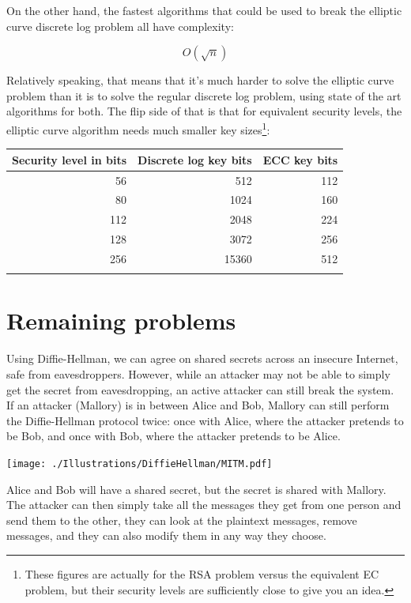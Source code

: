 \documentclass[11pt,ebook,table,dvipsnames]{memoir}
\begin{document}
On the other hand, the fastest algorithms that could be used to break
the elliptic curve discrete log problem all have complexity:

\[
O(\sqrt{n})
\]

Relatively speaking, that means that it's much harder to solve the
elliptic curve problem than it is to solve the regular discrete log
problem, using state of the art algorithms for both. The flip side of
that is that for equivalent security levels, the elliptic curve
algorithm needs much smaller key
sizes\cite{rsa:keysizes}\cite{nist:keymanagement}\footnote{These figures are
actually for the RSA problem versus the equivalent EC problem, but
their security levels are sufficiently close to give you an idea.}:

\begin{center}
\begin{tabular}{rrr}
Security level in bits & Discrete log key bits & ECC key bits\\
\hline
56 & 512 & 112\\
80 & 1024 & 160\\
112 & 2048 & 224\\
128 & 3072 & 256\\
256 & 15360 & 512\\
 &  & \\
\end{tabular}
\end{center}
\section{Remaining problems}
\label{sec-2-4-5}

Using Diffie-Hellman, we can agree on shared secrets across an
insecure Internet, safe from eavesdroppers. However, while an attacker
may not be able to simply get the secret from eavesdropping, an active
attacker can still break the system. If an attacker (Mallory) is in
between Alice and Bob, Mallory can still perform the Diffie-Hellman
protocol twice: once with Alice, where the attacker pretends to be
Bob, and once with Bob, where the attacker pretends to be Alice.

\texttt{[image: ./Illustrations/DiffieHellman/MITM.pdf]}

Alice and Bob will have a shared secret, but the secret is shared with
Mallory. The attacker can then simply take all the messages they get
from one person and send them to the other, they can look at the
plaintext messages, remove messages, and they can also modify them in
any way they choose.
\end{document}
